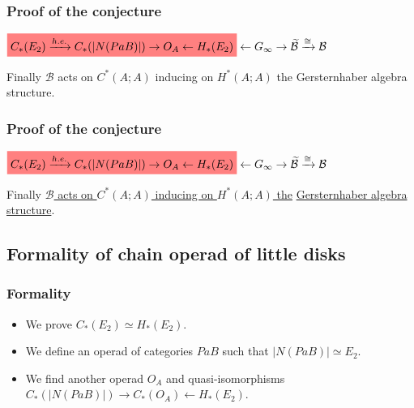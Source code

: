 \documentclass{beamer}
\theoremstyle{definition}
\newcommand{\highlight}[1]{%
	\colorbox{red!50}{$\displaystyle#1$}}
\begin{document}
\begin{frame}
	\frametitle{Proof of the conjecture}
	$\highlight{C_*(E_2)\xrightarrow{h. e.} C_*(|N(PaB)|)\to O_A\leftarrow H_*(E_2)} \leftarrow G_\infty \to \widetilde{\mathcal{B}}\xrightarrow{\cong}\mathcal{B}$
\vspace{1cm}

Finally $\mathcal{B}$ acts on $C^*(A;A)$ inducing on $H^*(A;A)$ the Gersternhaber algebra structure.
\end{frame}

\begin{frame}
	\frametitle{Proof of the conjecture}
	$\highlight{C_*(E_2)\xrightarrow{h. e.} C_*(|N(PaB)|)\to O_A\leftarrow H_*(E_2)} \leftarrow G_\infty \to \widetilde{\mathcal{B}}\xrightarrow{\cong}\mathcal{B}$
	\vspace{1cm}
	
	Finally \underline{$\mathcal{B}$ acts on $C^*(A;A)$ inducing on $H^*(A;A)$ the} \underline{Gersternhaber algebra structure}.
\end{frame}

\subsection{Formality of chain operad of little disks}
\begin{frame}
	\frametitle{Formality}
	\begin{itemize}
		\item<1-> We prove $C_*(E_2)\simeq H_*(E_2)$.
		\item<2-> We define an operad of categories $PaB$ such that $|N(PaB)|\simeq E_2$. 
		\item<3-> We find another operad $O_A$ and quasi-isomorphisms $C_*(|N(PaB)|)\to C_*(O_A)\leftarrow H_*(E_2)$. 
	\end{itemize}%
\end{frame}
\end{document}
